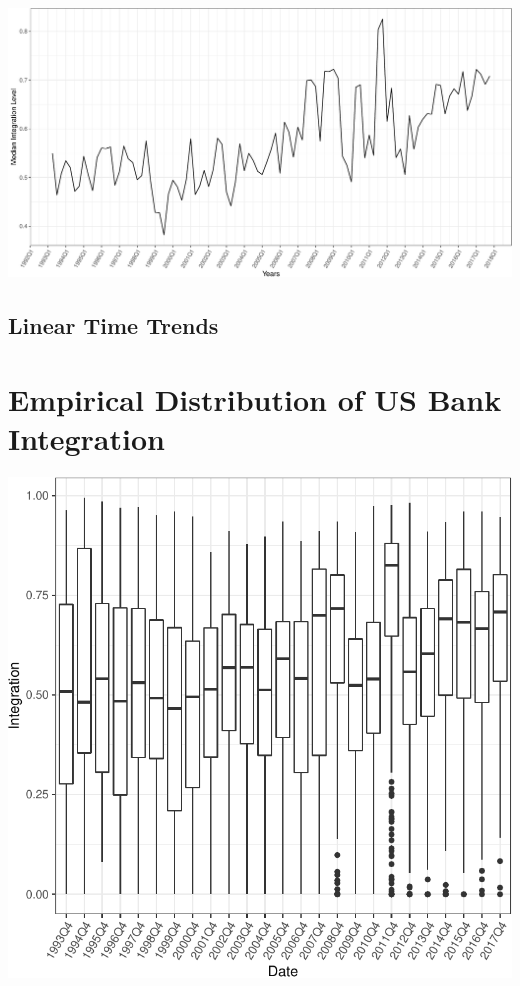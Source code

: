 \documentclass[11pt,]{article}
\begin{document}
\begin{center}\includegraphics{AC_US_Bank_Int_Results_1_files/figure-latex/med_US_bank_int-1} \end{center}

\subsection{Linear Time Trends}\label{linear-time-trends}

\section{Empirical Distribution of US Bank
Integration}\label{empirical-distribution-of-us-bank-integration}

\begin{center}\includegraphics{AC_US_Bank_Int_Results_1_files/figure-latex/emp_distr_US_bank_int-1} \end{center}
\end{document}
